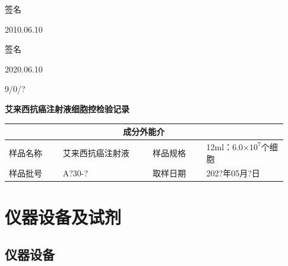 \documentclass[UTF8,10pt,a4paper,fontset=fandol]{ctexart}
\newcommand{\fieldvalue}[1]{#1}
\newcommand{\handwritten}[1]{#1}
\begin{document}
\handwritten{签名}

\handwritten{2010.06.10}

\handwritten{签名}

\handwritten{2020.06.10}

\handwritten{9/0/?}

\newpage

\begin{center}
\textbf{艾来西抗癌注射液细胞控检验记录}
\end{center}

\begin{tabular}{|p{0.18\linewidth}|p{0.30\linewidth}|p{0.18\linewidth}|p{0.27\linewidth}|}
\hline
\multicolumn{4}{c|}{\textbf{成分外能介}}\\
\hline
样品名称 &
\fieldvalue{艾来西抗癌注射液} &
样品规格 &
\fieldvalue{12ml：6.0$\times 10^{7}$个细胞}\\
\hline
样品批号 &
\fieldvalue{\handwritten{A?30-?}} &
取样日期 &
\fieldvalue{\handwritten{202?年05月?日}}\\
\hline
\end{tabular}

\section{仪器设备及试剂}

\subsection{仪器设备}
\end{document}
